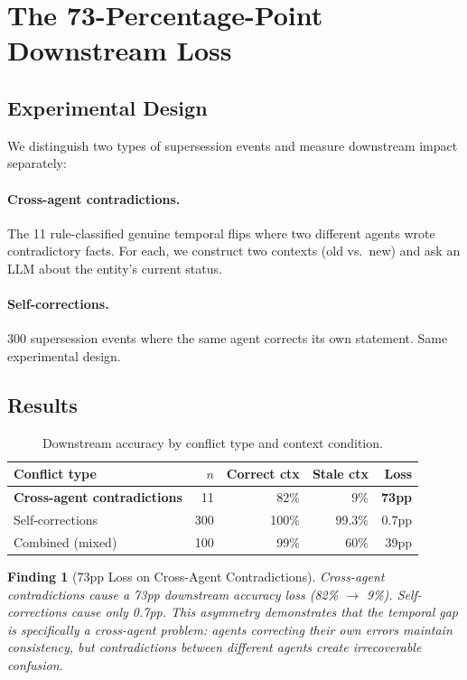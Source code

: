 \documentclass{article}
\newtheorem{finding}{Finding}
\begin{document}
\section{The 73-Percentage-Point Downstream Loss}
\label{sec:downstream}

\subsection{Experimental Design}

We distinguish two types of supersession events and measure downstream impact separately:

\paragraph{Cross-agent contradictions.} The 11 rule-classified genuine temporal flips where two different agents wrote contradictory facts. For each, we construct two contexts (old vs.\ new) and ask an LLM about the entity's current status.

\paragraph{Self-corrections.} 300 supersession events where the same agent corrects its own statement. Same experimental design.

\subsection{Results}

\begin{table}[h]
\centering
\caption{Downstream accuracy by conflict type and context condition.}
\begin{tabular}{lrrrr}
\toprule
Conflict type & $n$ & Correct ctx & Stale ctx & Loss \\
\midrule
\textbf{Cross-agent contradictions} & 11 & 82\% & 9\% & \textbf{73pp} \\
Self-corrections & 300 & 100\% & 99.3\% & 0.7pp \\
\midrule
Combined (mixed) & 100 & 99\% & 60\% & 39pp \\
\bottomrule
\end{tabular}
\label{tab:downstream}
\end{table}

\begin{finding}[73pp Loss on Cross-Agent Contradictions]
Cross-agent contradictions cause a 73pp downstream accuracy loss (82\% $\to$ 9\%). Self-corrections cause only 0.7pp. This asymmetry demonstrates that the temporal gap is specifically a \emph{cross-agent} problem: agents correcting their own errors maintain consistency, but contradictions between different agents create irrecoverable confusion.
\end{finding}
\end{document}
